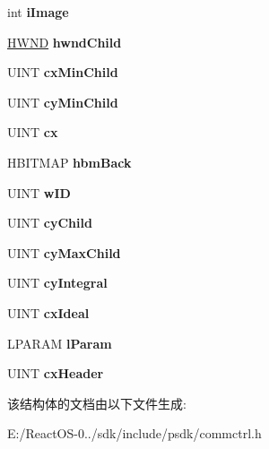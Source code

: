 \begin{DoxyCompactItemize}
int {\bfseries i\+Image}
\item 
\mbox{\label{structtag_r_e_b_a_r_b_a_n_d_i_n_f_o_w_a7c850936a341aea5086ad593ea58c8a3}} 
\hyperlink{interfacevoid}{H\+W\+ND} {\bfseries hwnd\+Child}
\item 
\mbox{\label{structtag_r_e_b_a_r_b_a_n_d_i_n_f_o_w_a98e2bd82e48c2d8c163dba1f13c00453}} 
U\+I\+NT {\bfseries cx\+Min\+Child}
\item 
\mbox{\label{structtag_r_e_b_a_r_b_a_n_d_i_n_f_o_w_aaca01833fa9ce20aee7b8b4a2020e4aa}} 
U\+I\+NT {\bfseries cy\+Min\+Child}
\item 
\mbox{\label{structtag_r_e_b_a_r_b_a_n_d_i_n_f_o_w_a8a3da80ce17a8e992fd2fbf8d0c0542c}} 
U\+I\+NT {\bfseries cx}
\item 
\mbox{\label{structtag_r_e_b_a_r_b_a_n_d_i_n_f_o_w_a3864fd33c374abcb85ee3433397ab941}} 
H\+B\+I\+T\+M\+AP {\bfseries hbm\+Back}
\item 
\mbox{\label{structtag_r_e_b_a_r_b_a_n_d_i_n_f_o_w_a9882214602dfcc48248ffb693f91e235}} 
U\+I\+NT {\bfseries w\+ID}
\item 
\mbox{\label{structtag_r_e_b_a_r_b_a_n_d_i_n_f_o_w_a82086ab531e210e835e34f4c8cb43731}} 
U\+I\+NT {\bfseries cy\+Child}
\item 
\mbox{\label{structtag_r_e_b_a_r_b_a_n_d_i_n_f_o_w_ad161ad630f6df4e323e554756a51d6bc}} 
U\+I\+NT {\bfseries cy\+Max\+Child}
\item 
\mbox{\label{structtag_r_e_b_a_r_b_a_n_d_i_n_f_o_w_a9e47058691d60e7ef7b20bb8b868dccf}} 
U\+I\+NT {\bfseries cy\+Integral}
\item 
\mbox{\label{structtag_r_e_b_a_r_b_a_n_d_i_n_f_o_w_a9e42b8b349cd5c987b8e8c877ac78099}} 
U\+I\+NT {\bfseries cx\+Ideal}
\item 
\mbox{\label{structtag_r_e_b_a_r_b_a_n_d_i_n_f_o_w_af075f01c66bcef513edf88984ed5e36f}} 
L\+P\+A\+R\+AM {\bfseries l\+Param}
\item 
\mbox{\label{structtag_r_e_b_a_r_b_a_n_d_i_n_f_o_w_a4e2efcfd77c9c6763683547eb61b1c08}} 
U\+I\+NT {\bfseries cx\+Header}
\end{DoxyCompactItemize}


该结构体的文档由以下文件生成\+:\begin{DoxyCompactItemize}
\item 
E\+:/\+React\+O\+S-\/0../sdk/include/psdk/commctrl.\+h\end{DoxyCompactItemize}
